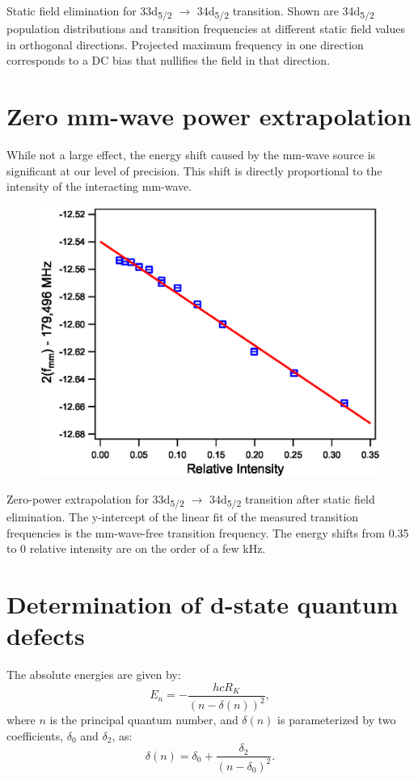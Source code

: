 \documentclass[landscape]{sciposter}
\begin{document}
\begin{multicols}{4}
Static field elimination for 33d\textsubscript{5/2} $\rightarrow$ 34d\textsubscript{5/2} transition. Shown are 34d\textsubscript{5/2} population distributions and transition frequencies at different static field values in orthogonal directions. Projected maximum frequency in one direction corresponds to a DC bias that nullifies the field in that direction.

\section*{Zero mm-wave power extrapolation}
While not a large effect, the energy shift caused by the mm-wave source is significant at our level of precision. This shift is directly proportional to the intensity of the interacting mm-wave. 

\begin{figure}
\begin{center}
\includegraphics[scale = 0.8]{33d52_PScans.eps}
\end{center}
\end{figure}

Zero-power extrapolation for 33d\textsubscript{5/2} $\rightarrow$ 34d\textsubscript{5/2} transition after static field elimination. The y-intercept of the linear fit of the measured transition frequencies is the mm-wave-free transition frequency. The energy shifts from 0.35 to 0 relative intensity are on the order of a few kHz.

\section*{Determination of d-state quantum defects}
The absolute energies are given by:
{\Large
$$E_n = -\frac{hcR_K}{(n - \delta(n))^2},$$}
where $n$ is the principal quantum number, and $\delta(n)$ is parameterized by two coefficients, $\delta_0$ and $\delta_2$, as:
{\Large
$$\delta(n) = \delta_0 + \frac{\delta_2}{(n-\delta_0)^2}.$$}


\end{multicols}
\end{document}
